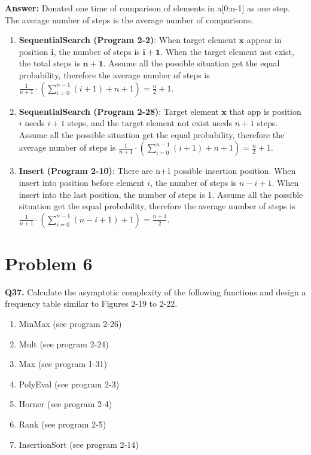 \documentclass{article}
\begin{document}
\textbf{Answer:}
Donated one time of comparison of elements in a[0:n-1] as one step. The average number of steps is the average number of comparisons.
\begin{enumerate}
    \item \textbf{SequentialSearch (Program 2-2)}:
          When target element $\mathbf{x}$ appear in position $\mathbf{i}$, the number of steps is $\mathbf{i+1}$. When the target element not exist, the total steps is $\mathbf{n+1}$. Assume all the possible situation get the equal probability, therefore the average number of steps is $\frac{1}{n+1}\cdot(\sum\limits_{i=0}^{n-1}(i+1)+n+1) =\boxed{\frac{n}{2}+1}$.
    \item \textbf{SequentialSearch (Program 2-28)}:
          Target element $\mathbf{x}$ that app is position $i$ needs $i+1$ steps, and the target element not exist needs $n+1$ steps. Assume all the possible situation get the equal probability, therefore the average number of steps is $\frac{1}{n+1}\cdot(\sum\limits_{i=0}^{n-1}(i+1)+n+1) =\boxed{\frac{n}{2}+1}$.
    \item \textbf{Insert (Program 2-10)}:
          There are n+1 possible insertion position. When insert into position before element $i$, the number of steps is $n-i+1$. When insert into the last position, the number of steps is 1. Assume all the possible situation get the equal probability, therefore the average number of steps is $\frac{1}{n+1}\cdot(\sum\limits_{i=0}^{n-1}(n-i+1)+1) =\boxed{\frac{n+3}{2}}$.
\end{enumerate}

\section{Problem 6}

\textbf{Q37.}
Calculate the asymptotic complexity of the following functions and design a frequency table similar to Figures 2-19 to 2-22.
\begin{enumerate}
    \item MinMax (see program 2-26)
    \item Mult (see program 2-24)
    \item Max (see program 1-31)
    \item PolyEval (see program 2-3)
    \item Horner (see program 2-4)
    \item Rank (see program 2-5)
    \item InsertionSort (see program 2-14)
\end{enumerate}
\end{document}
